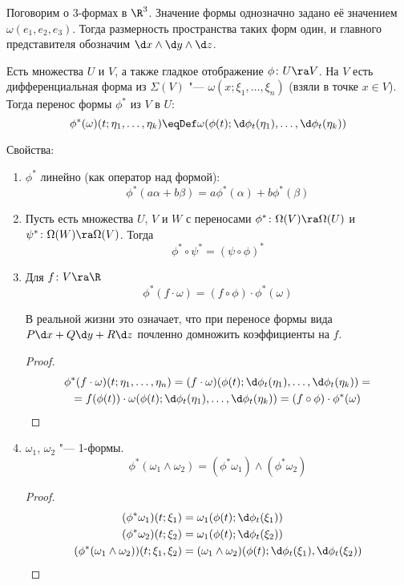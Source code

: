 Поговорим о 3-формах в $\R^3$. Значение формы однозначно задано её значением $\omega(e_1, e_2, e_3)$.
Тогда размерность пространства таких форм один, и главного представителя обозначим $\d x \wedge \d y \wedge \d z$.

\begin{Def}
	Есть множества $U$ и $V$, а также гладкое отображение $\phi\colon U \ra V$.
	На $V$ есть дифференциальная форма из $\Sigma(V)$ "--- $\omega(x; \xi_1, \dots, \xi_n)$ (взяли в точке $x \in V$).
	Тогда перенос формы $\phi^*$ из $V$ в $U$:
	\[ \phi^*(\omega)(t;\eta_1,\dots,\eta_k) \eqDef \omega(\phi(t); \d \phi_t(\eta_1), \dots, \d \phi_t(\eta_k)) \]
\end{Def}

Свойства:
\begin{enumerate}
\item
	$\phi^*$ линейно (как оператор над формой):
	\[ \phi^*(a\alpha + b\beta) = a\phi^*(\alpha) + b\phi^*(\beta) \]

\item
	Пусть есть множества $U$, $V$ и $W$ с переносами $\phi^*\colon \Omega(V) \ra \Omega(U)$ и $\psi^*\colon \Omega(W) \ra \Omega(V)$.
	Тогда
	\[ \phi^* \circ \psi^* = (\psi \circ \phi)^* \]

\item
	Для $f\colon V \ra \R$
	\[ \phi^*(f \cdot \omega) = (f \circ \phi) \cdot \phi^*(\omega) \]
	\begin{Rem}
		В реальной жизни это означает, что при переносе формы вида $P \d x + Q \d y + R \d z$ почленно домножить коэффициенты на $f$.
	\end{Rem}
	\begin{proof}
		\begin{gather*}
			\phi^* (f \cdot \omega)(t;\eta_1, \dots, \eta_n)
			= (f \cdot \omega)(\phi(t); \d \phi_t(\eta_1), \dots, \d \phi_t(\eta_k)) = \\
			= f(\phi(t)) \cdot \omega (\phi(t); \d \phi_t(\eta_1), \dots, \d \phi_t(\eta_k))
			= (f \circ \phi) \cdot \phi^*(\omega)
		\end{gather*}
	\end{proof}

\item
	$\omega_1$, $\omega_2$ "--- 1-формы.
	\[ \phi^*(\omega_1 \wedge \omega_2) = (\phi^* \omega_1) \wedge (\phi^* \omega_2) \]
	\begin{proof}
		\begin{align*}
			(\phi^* \omega_1) (t; \xi_1) &= \omega_1(\phi(t); \d \phi_t(\xi_1)) \\
			(\phi^* \omega_2) (t; \xi_2) &= \omega_1(\phi(t); \d \phi_t(\xi_2)) \\
			(\phi^* (\omega_1 \wedge \omega_2)) (t; \xi_1, \xi_2) &= (\omega_1 \wedge \omega_2)(\phi(t); \d \phi_t(\xi_1), \d \phi_t(\xi_2))
		\end{align*}
	\end{proof}
\end{enumerate}

